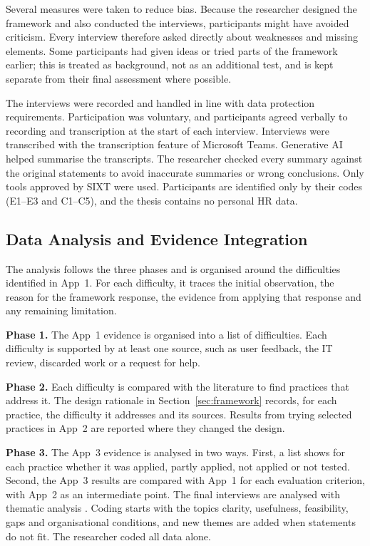 \documentclass[10pt,a4paper]{article}
\begin{document}
Several measures were taken to reduce bias. Because the researcher
designed the framework and also conducted the interviews, participants
might have avoided criticism. Every interview therefore asked directly
about weaknesses and missing elements. Some participants had given
ideas or tried parts of the framework earlier; this is treated as
background, not as an additional test, and is kept separate from their
final assessment where possible.

The interviews were recorded and handled in line with data protection
requirements. Participation was voluntary, and participants agreed
verbally to recording and transcription at the start of each interview.
Interviews were transcribed with the transcription feature of Microsoft
Teams. Generative AI helped summarise the transcripts. The researcher
checked every summary against the original statements to avoid
inaccurate summaries or wrong conclusions. Only tools approved by SIXT
were used. Participants are identified only by their codes (E1--E3 and
C1--C5), and the thesis contains no personal HR data.


\subsection{Data Analysis and Evidence Integration}
\label{sec:method-analysis}
 
The analysis follows the three phases and is organised around the
difficulties identified in App~1. For each difficulty, it traces the
initial observation, the reason for the framework response, the
evidence from applying that response and any remaining limitation.
 
\textbf{Phase 1.} The App~1 evidence is organised into a list of
difficulties. Each difficulty is supported by at least one source, such
as user feedback, the IT review, discarded work or a request for help.
 
\textbf{Phase 2.} Each difficulty is compared with the literature to
find practices that address it. The design rationale in
Section~\ref{sec:framework} records, for each practice, the difficulty
it addresses and its sources. Results from trying selected practices
in App~2 are reported where they changed the design.
 
\textbf{Phase 3.} The App~3 evidence is analysed in two ways. First, a
list shows for each practice whether it was applied, partly applied,
not applied or not tested. Second, the App~3 results are compared with
App~1 for each evaluation criterion, with App~2 as an intermediate
point. The final interviews are analysed with thematic analysis
\parencite{braun2006thematic}. Coding starts with the topics clarity,
usefulness, feasibility, gaps and organisational conditions, and new
themes are added when statements do not fit. The researcher coded all
data alone.
 
\end{document}
